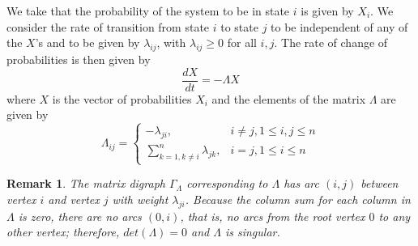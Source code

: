 \documentclass{article}
\newtheorem{remark}{Remark}
\begin{document}
We take that the probability of the system to be in state $i$ is given by $X_i$.  We consider the rate of transition from state $i$ to state $j$ to be independent of any of the $X$'s and to be given by $\lambda_{ij}$, with $\lambda_{ij} \ge 0$ for all $i,j$.  The rate of change of probabilities is then given by
\begin{equation}
\frac{dX}{dt} = -\Lambda X
\label{eq:dXdt}
\end{equation}
where $X$ is the vector of probabilities $X_i$ and the elements of the matrix $\Lambda$ are given by
\begin{equation}
\Lambda_{ij} = 
\begin{cases}
-\lambda_{ji}, & i\ne j, 1 \leq i, j \leq n\\
 \sum_{k = 1, k\ne i}^n \lambda_{jk}, & i = j, 1 \leq i \leq n
\end{cases}
\label{eq:Lambda_elements}
\end{equation}

\begin{remark}
The matrix digraph $\Gamma_\Lambda$ corresponding to $\Lambda$ has arc $(i,j)$ between vertex $i$ and vertex $j$ with weight $\lambda_{ji}$.  Because the column sum for each column in $\Lambda$ is zero, there are no arcs $(0, i)$, that is, no arcs from the root vertex $0$ to any other vertex; therefore, $det(\Lambda) = 0$ and $\Lambda$ is singular.
\label{remark:Lambda}
\end{remark}
\end{document}
